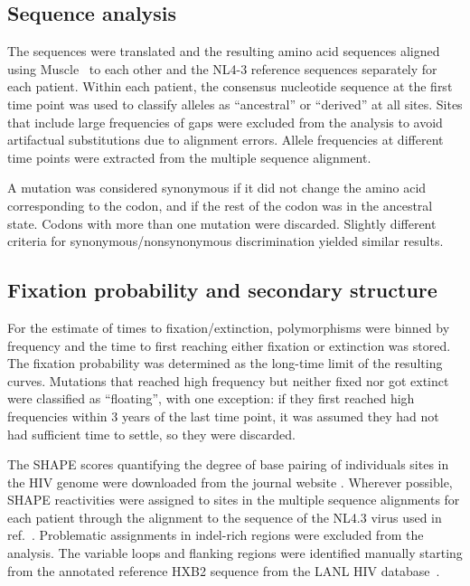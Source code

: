 \documentclass[rmp, twocolumn]{revtex4}
\begin{document}
\subsection{Sequence analysis}
The sequences were translated and the resulting amino acid sequences aligned
using Muscle~\citep{edgar_muscle:_2004} to each other and the NL4-3 reference
sequences separately for each patient. Within each patient, the consensus
nucleotide sequence at the first time point was used to classify alleles as
``ancestral'' or ``derived'' at all sites. Sites that include large
frequencies of gaps were excluded from the analysis to avoid artifactual
substitutions due to alignment errors. Allele frequencies at different time
points were extracted from the multiple sequence alignment.

A mutation was considered synonymous if it did not change the amino acid
corresponding to the codon, and if the rest of the codon was in the ancestral
state. Codons with more than one mutation were discarded. Slightly different
criteria for synonymous/nonsynonymous discrimination yielded similar results.

\subsection{Fixation probability and secondary structure}
For the estimate of times to fixation/extinction, polymorphisms were binned by
frequency and the time to first reaching either fixation or extinction was
stored. The fixation probability was determined as the long-time limit of the
resulting curves. Mutations that reached high frequency but neither fixed nor
got extinct were classified as ``floating'', with one exception: if they first
reached high frequencies within 3 years of the last time point, it was assumed
they had not had sufficient time to settle, so they were discarded.

The SHAPE scores quantifying the degree of base pairing of individuals sites in
the HIV genome were downloaded from the journal website
\citep{watts_architecture_2009}. Wherever possible, SHAPE reactivities were
assigned to sites in the multiple sequence alignments for each patient through
the alignment to the sequence of the NL4.3 virus used in
ref.~\citep{watts_architecture_2009}. Problematic assignments in indel-rich
regions were excluded from the analysis. The variable loops and flanking
regions were identified manually starting from the annotated reference HXB2
sequence from the LANL HIV database~\citep{LANL2012}. 
\end{document}
